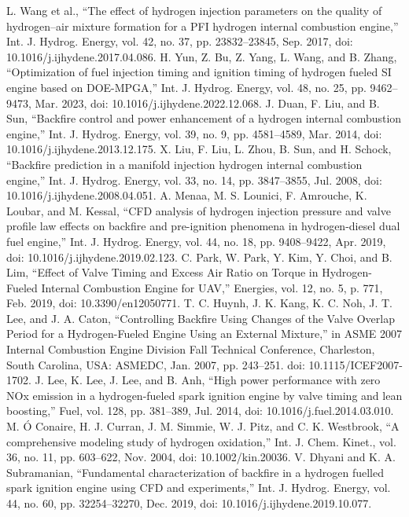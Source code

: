 \documentclass[conference]{IEEEtran}
\begin{document}
\begin{thebibliography}{00}
 L. Wang et al., “The effect of hydrogen injection parameters on the quality of hydrogen–air mixture formation for a PFI hydrogen internal combustion engine,” Int. J. Hydrog. Energy, vol. 42, no. 37, pp. 23832–23845, Sep. 2017, doi: 10.1016/j.ijhydene.2017.04.086.
 H. Yun, Z. Bu, Z. Yang, L. Wang, and B. Zhang, “Optimization of fuel injection timing and ignition timing of hydrogen fueled SI engine based on DOE-MPGA,” Int. J. Hydrog. Energy, vol. 48, no. 25, pp. 9462–9473, Mar. 2023, doi: 10.1016/j.ijhydene.2022.12.068.
 J. Duan, F. Liu, and B. Sun, “Backfire control and power enhancement of a hydrogen internal combustion engine,” Int. J. Hydrog. Energy, vol. 39, no. 9, pp. 4581–4589, Mar. 2014, doi: 10.1016/j.ijhydene.2013.12.175.
 X. Liu, F. Liu, L. Zhou, B. Sun, and H. Schock, “Backfire prediction in a manifold injection hydrogen internal combustion engine,” Int. J. Hydrog. Energy, vol. 33, no. 14, pp. 3847–3855, Jul. 2008, doi: 10.1016/j.ijhydene.2008.04.051.
 A. Menaa, M. S. Lounici, F. Amrouche, K. Loubar, and M. Kessal, “CFD analysis of hydrogen injection pressure and valve profile law effects on backfire and pre-ignition phenomena in hydrogen-diesel dual fuel engine,” Int. J. Hydrog. Energy, vol. 44, no. 18, pp. 9408–9422, Apr. 2019, doi: 10.1016/j.ijhydene.2019.02.123.
 C. Park, W. Park, Y. Kim, Y. Choi, and B. Lim, “Effect of Valve Timing and Excess Air Ratio on Torque in Hydrogen-Fueled Internal Combustion Engine for UAV,” Energies, vol. 12, no. 5, p. 771, Feb. 2019, doi: 10.3390/en12050771.
 T. C. Huynh, J. K. Kang, K. C. Noh, J. T. Lee, and J. A. Caton, “Controlling Backfire Using Changes of the Valve Overlap Period for a Hydrogen-Fueled Engine Using an External Mixture,” in ASME 2007 Internal Combustion Engine Division Fall Technical Conference, Charleston, South Carolina, USA: ASMEDC, Jan. 2007, pp. 243–251. doi: 10.1115/ICEF2007-1702.
 J. Lee, K. Lee, J. Lee, and B. Anh, “High power performance with zero NOx emission in a hydrogen-fueled spark ignition engine by valve timing and lean boosting,” Fuel, vol. 128, pp. 381–389, Jul. 2014, doi: 10.1016/j.fuel.2014.03.010.
 M. Ó Conaire, H. J. Curran, J. M. Simmie, W. J. Pitz, and C. K. Westbrook, “A comprehensive modeling study of hydrogen oxidation,” Int. J. Chem. Kinet., vol. 36, no. 11, pp. 603–622, Nov. 2004, doi: 10.1002/kin.20036.
 V. Dhyani and K. A. Subramanian, “Fundamental characterization of backfire in a hydrogen fuelled spark ignition engine using CFD and experiments,” Int. J. Hydrog. Energy, vol. 44, no. 60, pp. 32254–32270, Dec. 2019, doi: 10.1016/j.ijhydene.2019.10.077.

\end{thebibliography}
\end{document}
